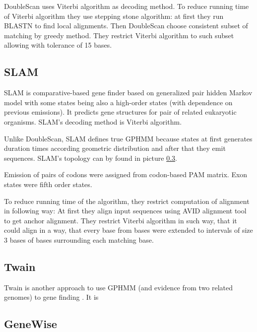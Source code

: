 DoubleScan uses Viterbi algorithm as decoding method.  To reduce running time of
Viterbi algorithm they use stepping stone algorithm: at first they run BLASTN to
find local alignments. Then DoubleScan choose consistent subset of matching by
greedy method. They restrict Viterbi algorithm to such subset allowing with
tolerance of 15 bases.

\subsection{SLAM}

SLAM is comparative-based gene finder \cite{SLAM2003} based on generalized pair
hidden Markov model \cite{Alexanderson2004} with some states being also a
high-order states (with dependence on previous emissions).  It predicts gene
structures for pair of related eukaryotic organisms. SLAM's decoding method is
Viterbi algorithm. 

Unlike DoubleScan, SLAM defines true GPHMM because states at first generates
duration times according geometric distribution and after that they emit
sequences. SLAM's topology can by found in picture \ref{}. 

Emission of pairs of codons were assigned from codon-based PAM matrix. Exon
states were fifth order states.

To reduce running time of the algorithm, they restrict computation of alignment
in following way: At first they  align input sequences using AVID alignment
tool\cite{} to get anchor alignment. They restrict Viterbi algorithm in such
way, that it could align  in a way, that every base from  bases were extended to
intervals of size $3$ bases of bases surrounding each matching base.



\subsection{Twain}

Twain is another approach to use GPHMM (and evidence from two related genomes)
to gene finding \cite{Majoros2005}. It is 



\subsection{GeneWise}


